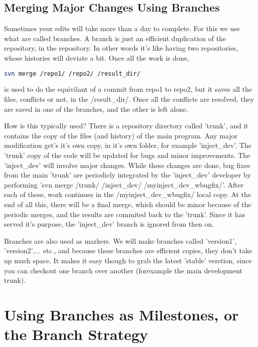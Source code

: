 \subsection{Merging Major Changes Using Branches}


   Sometimes your edits will take more than a day to complete. For this we use
   what are called branches. A branch is just an efficient duplication of the
   repository, in the repository. In other words it's like having two
   repositories, whose  
   histories will deviate a bit. Once all the work is done,
   \begin{lstlisting}[language=BASH]
     svn merge /repo1/ /repo2/ /result_dir/
   \end{lstlisting}
   \noindent is used to do the equivilant of a
   commit from repo1 to repo2, but it saves all the files, conflicts or not,
   in the /result\_dir/. Once all the conflicts are resolved, they are saved in
   one of the branches, and the other is left alone.

   How is this typically used? There is a repository directory called 'trunk',
   and it contains the copy of the files (and history) of the main program. 
   Any major modification get's it's own copy, in it's own folder, for example
   'inject\_dev'. The 'trunk' copy of the code will be updated for bugs and 
   minor improvements. The 'inject\_dev' will involve major changes. While
   these changes are done, bug fixes from the main 'trunk' are periodicly 
   integrated by the 'inject\_dev' developer by performing 
   'svn merge /trunk/ /inject\_dev/ /myinject\_dev\_wbugfix/'. After each of these,
   work continues in the /myinject\_dev\_wbugfix/ local copy. At the end of all 
   this, there will be a final merge, which should be minor because of the 
   periodic merges, and the results are commited back to the 'trunk'. Since it
   has served it's purpose, the 'inject\_dev' branch is ignored from then on.

   Branches are also used as markers. We will make branches called 'version1',
   'version2',... etc., and because these branches are efficient copies, they
   don't take up much space. It makes it easy though to grab the latest 'stable'
   verstion, since you can checkout one branch over another (forexample the 
   main development trunk). 

\section{Using Branches as Milestones, or the Branch Strategy}

